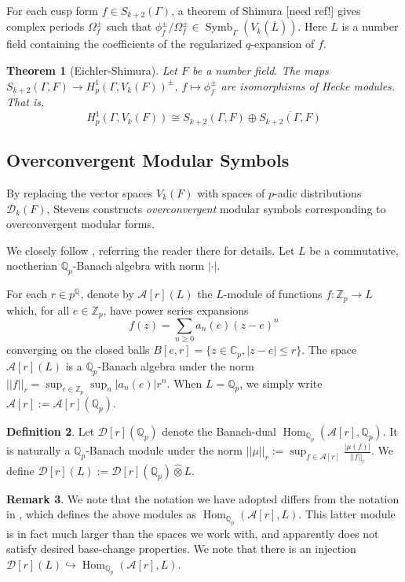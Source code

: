 \documentclass[10pt]{amsart}
\theoremstyle{plain}
\newtheorem{theorem}{Theorem}[section]
\theoremstyle{definition}
\newtheorem{definition}[theorem]{Definition}
\newtheorem{remark}[theorem]{Remark}
\newcommand{\ZZ}{{\mathbb{Z}}}
\newcommand{\CC}{{\mathbb{C}}}
\newcommand{\QQ}{{\mathbb{Q}}}
\newcommand{\cA}{\mathcal{A}}
\newcommand{\cD}{\mathcal{D}}
\DeclareMathOperator{\Hom}{Hom}
\DeclareMathOperator{\Symb}{Symb}
\begin{document}
For each cusp form $f\in S_{k+2}(\Gamma)$, a theorem of Shimura [need ref!] gives complex periods $\Omega_f^\pm$ such that $\phi_f^\pm/\Omega_f^\pm \in \Symb_\Gamma(V_k(\overline{L}))$. Here $L$ is a number field containing the coefficients of the regularized $q$-expansion of $f$.
\begin{theorem}[Eichler-Shimura]
Let $F$ be a number field. The maps $S_{k+2}(\Gamma,F)\longrightarrow H^1_p(\Gamma, V_k(F))^\pm$, $f\mapsto \phi_{f}^\pm$ are isomorphisms of Hecke modules. That is,
\begin{equation*}
	H^1_p(\Gamma, V_k(F)) \cong S_{k+2}(\Gamma,F)\oplus \overline{S_{k+2}(\Gamma,F)}
\end{equation*}
\end{theorem}

\subsection{Overconvergent Modular Symbols}
By replacing the vector spaces $V_k(F)$ with spaces of $p$-adic distributions $\cD_k(F)$, Stevens \cite{Stevens} constructs \emph{overconvergent} modular symbols corresponding to  overconvergent modular forms.

We closely follow \cite{Bellaiche}, referring the reader there for details. Let $L$ be a commutative, noetherian $\QQ_p$-Banach algebra with norm $|\cdot |$. 

For each $r\in p^\QQ$, denote by $\cA[r](L)$ the $L$-module of functions $f:\ZZ_p\rightarrow L$ which, for all $e\in\ZZ_p$,  have power series expansions 
\begin{equation*}
	f(z) = \sum_{n \geq 0 } a_n(e) (z-e)^n
\end{equation*}
converging on the closed balls $B[e,r] = \{z \in \CC_p, |z-e| \leq r\}$. The space $\cA[r](L)$ is a $\QQ_p$-Banach algebra under the norm $||f ||_r = \sup_{e\in\ZZ_p} \sup_n |a_n(e)|r^n$. When $L=\QQ_p$, we simply write $\cA[r]:=\cA[r](\QQ_p)$.



\begin{definition}
Let $\cD[r](\QQ_p)$ denote the Banach-dual $\Hom_{\QQ_p}(\cA[r],\QQ_p)$. It is naturally a $\QQ_p$-Banach module under the norm $||\mu||_r := \sup_{f\in \cA[r]} \frac{ |\mu(f)|}{||f||_r}$. We define $\cD[r](L) :=\cD[r](\QQ_p) \widehat{\otimes} L$.
\end{definition}

\begin{remark}
We note that the notation we have adopted differs from the notation in \cite{HarronPollack}, which defines the above modules as $\Hom_{\QQ_p}(\cA[r],L)$. This latter module is in fact much larger than the spaces we work with, and apparently does not satisfy desired base-change properties. We note that there is an injection $\cD[r](L)\hookrightarrow \Hom_{\QQ_p} (\cA[r], L)$.
\end{remark}
\end{document}
